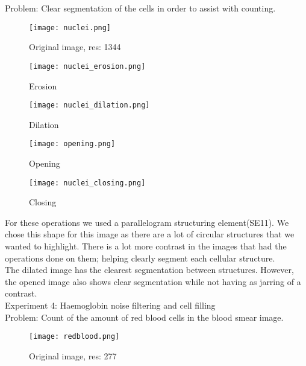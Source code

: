 \documentclass[a4paper]{article}
\begin{document}
Problem: Clear segmentation of the cells in order to assist with counting.\\
\begin{figure}[htp]
    \centering
    \texttt{[image: nuclei.png]}
    \caption{Original image, res: 1344}
    \label{fig:erosionSym}
\end{figure}
\begin{figure}[ht] 
  \label{ fig7} 
  \begin{minipage}[b]{0.5\linewidth}
    \centering
    \texttt{[image: nuclei\_erosion.png]} 
    \caption{Erosion} 
    \vspace{4ex}
  \end{minipage}%
  \begin{minipage}[b]{0.5\linewidth}
    \centering
    \texttt{[image: nuclei\_dilation.png]} 
    \caption{Dilation} 
    \vspace{4ex}
  \end{minipage} 
  \begin{minipage}[b]{0.5\linewidth}
    \centering
    \texttt{[image: opening.png]} 
    \caption{Opening} 
    \vspace{4ex}
  \end{minipage}%
  \begin{minipage}[b]{0.5\linewidth}
    \centering
    \texttt{[image: nuclei\_closing.png]} 
    \caption{Closing} 
    \vspace{4ex}
  \end{minipage} 
\end{figure} 

For these operations we used a parallelogram structuring element(SE11). We chose this shape for this image as there are a lot of circular structures that we wanted to highlight. There is a lot more contrast in the images that had the operations done on them; helping clearly segment each cellular structure.\\

The dilated image has the clearest segmentation between structures. However, the opened image also shows clear segmentation while not having as jarring of a contrast. \\


\large{Experiment 4: Haemoglobin noise filtering and cell filling} \\

Problem: Count of the amount of red blood cells in the blood smear image.
\begin{figure}[htp]
    \centering
    \texttt{[image: redblood.png]}
    \caption{Original image, res: 277}
    \label{fig:erosionSym}
\end{figure}\\
\end{document}
